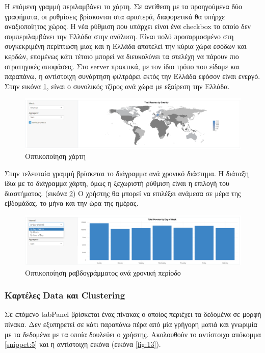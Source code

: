 \documentclass[greek, 12pt]{article}
\begin{document}
Η επόμενη γραμμή περιλαμβάνει το χάρτη. Σε αντίθεση με τα προηγούμενα δύο γραφήματα, οι ρυθμίσεις βρίσκονται στα αριστερά, διαφορετικά θα υπήρχε αναξιοποίητος χώρος. Η νέα ρύθμιση που υπάρχει είναι ένα checkbox το οποίο δεν συμπεριλαμβάνει την Ελλάδα στην ανάλυση. Είναι πολύ προσαρμοσμένο στη συγκεκριμένη περίπτωση μιας και η Ελλάδα αποτελεί την κύρια χώρα εσόδων και κερδών, επομένως κάτι τέτοιο μπορεί να διευκολύνει τα στελέχη να πάρουν πιο στρατηγικές αποφάσεις. Στο server πρακτικά, με τον ίδιο τρόπο που είδαμε και παραπάνω, η αντίστοιχη συνάρτηση φιλτράρει εκτός την Ελλάδα εφόσον είναι ενεργό. Στην εικόνα \ref{fig:11}, είναι ο συνολικός τζίρος ανά χώρα με εξαίρεση την Ελλάδα.

\begin{figure}[h]
    \centering
    \includegraphics[width=\textwidth]{pictures/11_map_visual.png}
    \caption{Οπτικοποίηση χάρτη}
    \label{fig:11}
\end{figure}

Στην τελευταία γραμμή βρίσκεται το διάγραμμα ανά χρονικό διάστημα. Η διάταξη ίδια με το διάγραμμα χάρτη, όμως η ξεχωριστή ρύθμιση είναι η επιλογή του διαστήματος. (εικόνα \ref{fig:12}) Ο χρήστης θα μπορεί να επιλέξει ανάμεσα σε μέρα της εβδομάδας, το μήνα και την ώρα της ημέρας.

\begin{figure}[h]
    \centering
    \includegraphics[width=\textwidth]{pictures/12_timebar_visual.png}
    \caption{Οπτικοποίηση ραβδογράμματος ανά χρονική περίοδο}
    \label{fig:12}
\end{figure}

\subsubsection{Καρτέλες Data και Clustering}

Σε επόμενο tabPanel βρίσκεται ένας πίνακας ο οποίος περιέχει τα δεδομένα σε μορφή πίνακα. Δεν εξυπηρετεί σε κάτι παραπάνω πέρα από μία γρήγορη ματιά και γνωριμία με τα δεδομένα με τα οποία δουλεύει ο χρήστης. Ακολουθούν το αντίστοιχο απόκομμα \ref{snippet:5} και η αντίστοιχη εικόνα (εικόνα \ref{fig:13}). 
\end{document}

